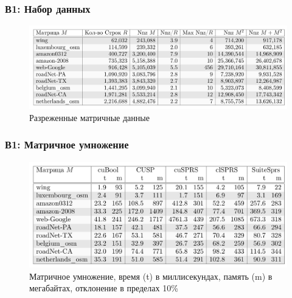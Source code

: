 \documentclass[aspectratio=169,xcolor=table,english]{beamer}
\begin{document}
\begin{frame}[fragile] \frametitle{В1: Набор данных}
    \begin{center}
     \begin{minipage}[m]{0.9\linewidth}
        \begin{figure}
            \centering
            \includegraphics[width=1.0\textwidth]{figures/dataset_rq1.png}
            \caption{Разреженные матричные данные}
        \end{figure}
    \end{minipage}\hfill   
    \end{center}
\end{frame}

\begin{frame}[fragile] \frametitle{В1: Матричное умножение}
    \begin{center}
     \begin{minipage}[m]{0.85\linewidth}
        \begin{figure}
            \centering
            \includegraphics[width=1.0\textwidth]{figures/results_1_rq1.png}
            \caption{Матричное умножение, время (t) в миллисекундах, память (m) в мегабайтах, отклонение в пределах 10\%}
        \end{figure}
    \end{minipage}\hfill   
    \end{center}
\end{frame}
\end{document}
